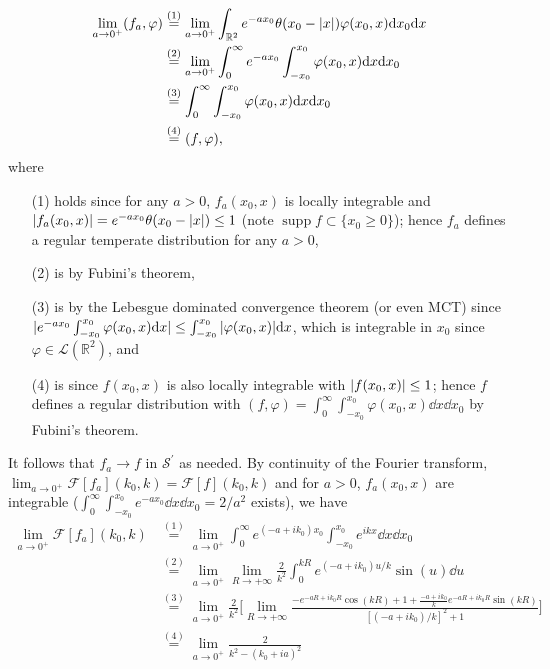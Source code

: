 \documentclass[11pt]{article}
\newcommand{\eq}[1]{\overset{(#1)}{=}}
\DeclareMathOperator{\supp}{supp}
\begin{document}
\begin{enumerate}
\begin{enumerate}[label=(\roman*)]
        \begin{align*}
            \lim_{a\to0^+}(f_a,\varphi) &\eq{1} \lim_{a\to0^+}\int_{\mathbb R^2}e^{-ax_0}\theta(x_0-\abs{x})\varphi(x_0,x)\dd x_0\dd x\\
            &\eq{2} \lim_{a\to0^+}\int_0^\infty e^{-ax_0}\int_{-x_0}^{x_0}\varphi(x_0,x)\dd x\dd x_0\\
            &\eq{3} \int_0^\infty \int_{-x_0}^{x_0}\varphi(x_0,x)\dd x\dd x_0\\
            &\eq{4} (f,\varphi),
        \end{align*} where \begin{enumerate}
            \item[(1)] holds since for any $a>0$, $f_a(x_0,x)$ is locally integrable and $\abs{f_a(x_0,x)} = e^{-ax_0}\theta(x_0-\abs{x}) \leq 1$ (note $\supp f\subset \{x_0\geq 0\}$); hence $f_a$ defines a regular temperate distribution for any $a>0$,
            \item[(2)] is by Fubini's theorem,
            \item[(3)] is by the Lebesgue dominated convergence theorem (or even MCT) since $|e^{-ax_0}\int_{-x_0}^{x_0}\varphi(x_0,x)\dd x |\leq \int_{-x_0}^{x_0}\abs{\varphi(x_0,x)}\dd x$, which is integrable in $x_0$ since $\varphi\in \mathcal L(\mathbb R^2)$, and
            \item[(4)] is since $f(x_0,x)$ is also locally integrable with $\abs{f(x_0,x)}\leq 1$; hence $f$ defines a regular distribution with $(f,\varphi) = \int_0^\infty \int_{-x_0}^{x_0}\varphi(x_0,x)\dd x\dd x_0$ by Fubini's theorem.
        \end{enumerate} It follows that $f_a\to f$ in $\mathcal S^\prime$ as needed. By continuity of the Fourier transform, $\lim_{a\to 0^+}\mathcal F[f_a](k_0,k) = \mathcal F[f](k_0,k)$ and for $a>0$, $f_a(x_0,x)$ are integrable ($\int_0^\infty \int_{-x_0}^{x_0}e^{-ax_0}\dd x\dd x_0 = 2/a^2$ exists), we have
        \begin{align*}
            \lim_{a\to 0^+}\mathcal F[f_a](k_0,k) &\eq{1} \lim_{a\to 0^+} \int_0^\infty e^{(-a+ik_0)x_0}\int_{-x_0}^{x_0}e^{ikx}\dd x \dd x_0\\
        &\eq{2} \lim_{a\to 0^+} \lim_{R\to+\infty} \frac{2}{k^2}\int_0^{kR} e^{(-a+ik_0)u/k}\sin(u) \dd u\\
        &\eq{3} \lim_{a\to 0^+}  \frac{2}{k^2}\bigg[\lim_{R\to+\infty} \frac{-e^{-aR+ik_0R}\cos(kR)+1+\frac{-a+ik_0}{k}e^{-aR+ik_0R}\sin(kR)}{[(-a+ik_0)/k]^2+1}\bigg]\\
        &\eq{4} \lim_{a\to 0^+}  \frac{2}{k^2-(k_0+ia)^2}\\

\end{align*}
\end{enumerate}
\end{enumerate}
\end{document}
